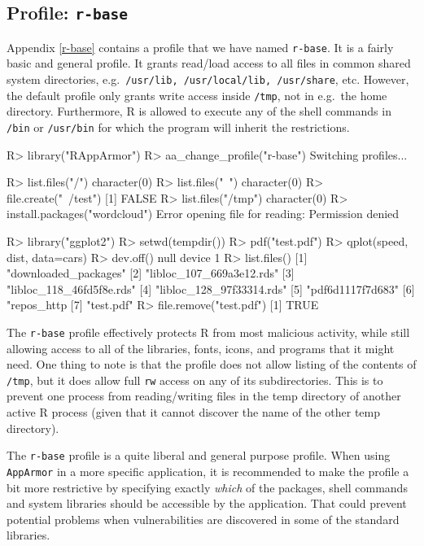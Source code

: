 \documentclass{jss}
\newcommand{\R}{\textsf{R}\xspace}
\newcommand{\AppArmor}{\texttt{AppArmor}\xspace}
\begin{document}
\subsection[Profile: r-base]{Profile: \texttt{r-base}}
\label{r-base-intro}

Appendix \ref{r-base} contains a profile that we have named \texttt{r-base}.
It is a fairly basic and general profile. It grants read/load access to all
files in common shared system directories, e.g.\ \texttt{/usr/lib,
/usr/local/lib, /usr/share}, etc. However, the default profile only grants
write access inside \texttt{/tmp}, not in e.g.\ the home directory. Furthermore,
\R is allowed to execute any of the shell commands in \texttt{/bin}
or \texttt{/usr/bin} for which the program will inherit the restrictions.

\begin{CodeChunk}
\begin{CodeInput}
R> library("RAppArmor")
R> aa_change_profile("r-base")
Switching profiles...

R> list.files("/")
character(0)
R> list.files("~")
character(0)
R> file.create("~/test")
[1] FALSE
R> list.files("/tmp")
character(0)
R> install.packages("wordcloud")
Error opening file for reading: Permission denied

R> library("ggplot2")
R> setwd(tempdir())
R> pdf("test.pdf")
R> qplot(speed, dist, data=cars)
R> dev.off()
null device
          1
R> list.files()
[1] "downloaded_packages"
[2] "libloc_107_669a3e12.rds"
[3] "libloc_118_46fd5f8e.rds"
[4] "libloc_128_97f33314.rds"
[5] "pdf6d1117f7d683"
[6] "repos_http%
[7] "test.pdf"
R> file.remove("test.pdf")
[1] TRUE
\end{CodeInput}
\end{CodeChunk}

The \texttt{r-base} profile effectively protects \R from most malicious
activity, while still allowing access to all of the libraries, fonts, icons, and
programs that it might need. One thing to note is that the profile
does not allow listing of the contents of \texttt{/tmp}, but it does allow full
\texttt{rw} access on any of its subdirectories. This is to prevent one process
from reading/writing files in the temp directory of another active \R process
(given that it cannot discover the name of the other temp directory).

The \texttt{r-base} profile is a quite liberal and general purpose profile. When
using \AppArmor in a more specific application, it is recommended to make the
profile a bit more restrictive by specifying exactly \emph{which} of the
packages, shell commands and system libraries should be accessible by the
application. That could prevent potential problems when vulnerabilities are
discovered in some of the standard libraries.
\end{document}
